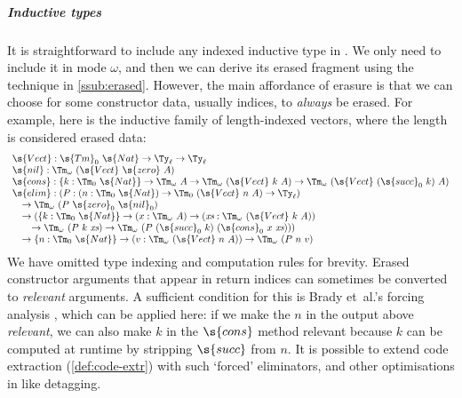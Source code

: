 \subparagraph{Inductive types}\label{ssub:inductive}

It is straightforward to include any indexed inductive type in \ZTT. We only
need to include it in mode $\omega$, and then we can derive its erased fragment
using the technique in \cref{ssub:erased}. However, the main affordance of
erasure is that we can choose for some constructor data, usually indices, to
\emph{always} be erased. For example, here is the inductive family of
length-indexed vectors, where the length is considered erased data:
\[
\begin{array}{l}
  \s{Vect} : \s{Tm}_0\ {\s{Nat}} \to \Ty_\ell \to \Ty_\ell \\
  \s{nil} : \Tm_\omega\ (\s{Vect}\ \s{zero}\ A) \\
  \s{cons} : \{k : \Tm_0\ \s{Nat}\} \to \Tm_\omega\ A \to
    \Tm_\omega\ (\s{Vect}\ k\ A) \to \Tm_\omega\ (\s{Vect}\ (\s{succ}_0\ k)\ A) \\
  \s{elim} : (P : (n : \Tm_0\ \s{Nat}) \to \Tm_0\ (\s{Vect}\ n\ A) \to \Ty_\ell) \\
  \quad \to \Tm_\omega\ (P\ \s{zero}_0\ \s{nil}_0) \\
  \quad \to (\{k : \Tm_0\ \s{Nat}\} \to (x : \Tm_\omega\ A)
  \to (\textit{xs} : \Tm_\omega\ (\s{Vect}\ k\ A))  \\
  \quad \quad \to \Tm_\omega\ (P\ k\ \textit{xs})
  \to \Tm_\omega\ (P\ (\s{succ}_0\ k)\ (\s{cons}_0\ x\ \textit{xs}))) \\
  \quad
  \to
  \{n : \Tm_0\ \s{Nat}\} \to
  (v : \Tm_\omega\ (\s{Vect}\ n\ A))
  \to \Tm_\omega\ (P\ n\ v) \\
\end{array}\]
We have omitted type indexing and computation rules for brevity. Erased constructor
arguments that appear in return indices can sometimes be converted to
\emph{relevant} arguments. A sufficient condition for this is Brady et~al.'s
forcing analysis \cite{Brady2004-ay}, which can be applied here: if we make the
$n$ in the output above \emph{relevant}, we can also make $k$ in the $\s{cons}$
method relevant because $k$ can be computed at runtime by stripping $\s{succ}$
from $n$. It is possible to extend code extraction (\cref{def:code-extr}) with such
`forced' eliminators, and other optimisations in \cite{Brady2004-ay} like
detagging.

